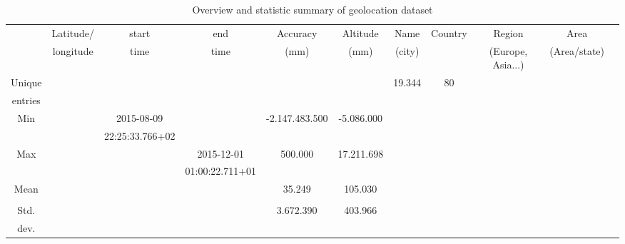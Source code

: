 \begin{table}[htbp]
        \centering
        \small
        \setlength\tabcolsep{2pt}
        \begin{tabular}{|c|c|c|c|c|c|c|c|c|c|c|}
            \hline
                         & Latitude/  &   start             & end               & Accuracy           & Altitude    & Name   & Country & Region             & Area          \\[-3pt]%
                         & longitude  &  time               & time              &  (mm)              & (mm)        & (city) &         & (Europe, Asia...)  & (Area/state)  \\
            \hline
                 Unique  &            &                     &                   &                    &             & 19.344 & 80      &                    &               \\
                 entries &            &                     &                   &                    &             &        &         &                    &               \\
            \hline
                 Min     &            &   2015-08-09        &                   &  -2.147.483.500    & -5.086.000  &        &         &                    &               \\
                         &            &   22:25:33.766+02   &                   &                    &             &        &         &                    &               \\
            \hline
                 Max     &            &                     &   2015-12-01      &  500.000           & 17.211.698  &        &         &                    &               \\
                         &            &                     &  01:00:22.711+01  &                    &             &        &         &                    &               \\
            \hline
                 Mean    &            &                     &                   & 35.249             & 105.030     &        &         &                    &               \\
                         &            &                     &                   &                    &             &        &         &                    &               \\
            \hline
                 Std.    &            &                     &                   & 3.672.390          & 403.966     &        &         &                    &               \\
                 dev.    &            &                     &                   &                    &             &        &         &                    &               \\
            \hline
        \end{tabular}
        \caption{Overview and statistic summary of geolocation dataset} %
        \label{tab:stat_geo}
\end{table}

